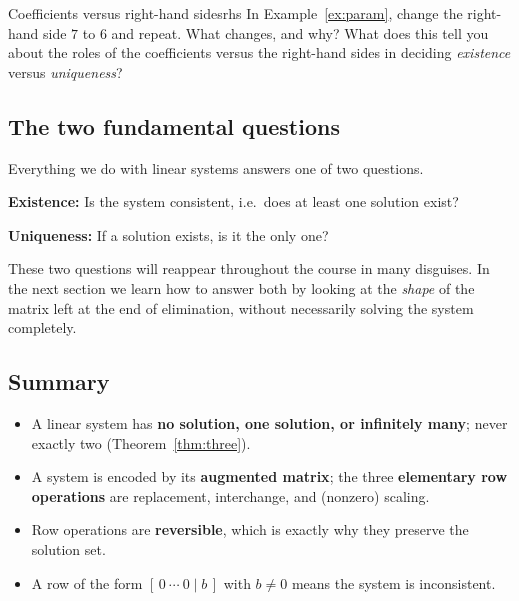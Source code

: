 \documentclass[11pt]{article}
\begin{document}
\begin{think}{Coefficients versus right-hand sides}{rhs}
In Example~\ref{ex:param}, change the right-hand side $7$ to $6$ and repeat. What changes, and
why? What does this tell you about the roles of the coefficients versus the right-hand sides in
deciding \emph{existence} versus \emph{uniqueness}?
\end{think}
 
\subsection*{The two fundamental questions}
 
Everything we do with linear systems answers one of two questions.
 
\begin{remark}
\textbf{Existence:} Is the system consistent, i.e.\ does at least one solution exist?
 
\textbf{Uniqueness:} If a solution exists, is it the only one?
\end{remark}
 
These two questions will reappear throughout the course in many disguises. In the next section we
learn how to answer both by looking at the \emph{shape} of the matrix left at the end of
elimination, without necessarily solving the system completely.
 
\subsection*{Summary}
\begin{itemize}
  \item A linear system has \textbf{no solution, one solution, or infinitely many}; never exactly two
        (Theorem~\ref{thm:three}).
  \item A system is encoded by its \textbf{augmented matrix}; the three \textbf{elementary row
        operations} are replacement, interchange, and (nonzero) scaling.
  \item Row operations are \textbf{reversible}, which is exactly why they preserve the solution set.
  \item A row of the form $[\,0\ \cdots\ 0\mid b\,]$ with $b\neq0$ means the system is inconsistent.
\end{itemize}
 
\end{document}
